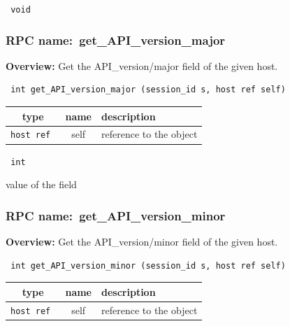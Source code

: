 {\tt 
void
}



\vspace{0.3cm}
\vspace{0.3cm}
\vspace{0.3cm}
\subsubsection{RPC name:~get\_API\_version\_major}

{\bf Overview:} 
Get the API\_version/major field of the given host.

\begin{verbatim} int get_API_version_major (session_id s, host ref self)\end{verbatim}



 
\vspace{0.3cm}
\begin{tabular}{|c|c|p{7cm}|}
 \hline
{\bf type} & {\bf name} & {\bf description} \\ \hline
{\tt host ref } & self & reference to the object \\ \hline 

\end{tabular}

\vspace{0.3cm}

{\tt 
int
}


value of the field
\vspace{0.3cm}
\vspace{0.3cm}
\vspace{0.3cm}
\subsubsection{RPC name:~get\_API\_version\_minor}

{\bf Overview:} 
Get the API\_version/minor field of the given host.

\begin{verbatim} int get_API_version_minor (session_id s, host ref self)\end{verbatim}



 
\vspace{0.3cm}
\begin{tabular}{|c|c|p{7cm}|}
 \hline
{\bf type} & {\bf name} & {\bf description} \\ \hline
{\tt host ref } & self & reference to the object \\ \hline 

\end{tabular}

